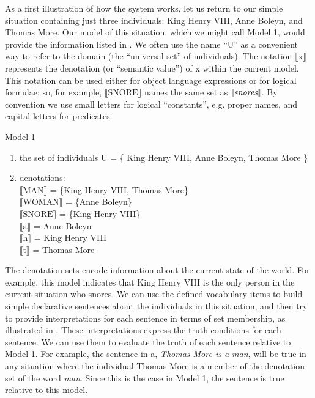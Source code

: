 As a first illustration of how the system works, let us return to our simple situation containing just three individuals: King Henry VIII, Anne Boleyn, and Thomas More. Our model of this situation, which we might call Model 1, would provide the information listed in . We often use the name “U” as a convenient way to refer to the domain (the “universal set” of individuals). The notation $\llbracket\text{x}\rrbracket$  represents the denotation (or “semantic value”) of x within the current model. This notation can be used either for object language expressions or for logical formulae; so, for example, $\llbracket\text{SNORE}\rrbracket$  names the same set as $\llbracket\text{\itshape snores}\rrbracket$. By convention we use small letters for logical “constants”, e.g. proper names, and capital letters for predicates.

\newpage 
\ea \label{ex:13.20}Model 1\\
\begin{enumerate}[label=\roman*.]
\item the set of individuals U = \{ King Henry VIII, Anne Boleyn, Thomas More \}
\item denotations:\\
$\llbracket\text{MAN}\rrbracket$  = \{King Henry VIII, Thomas More\}\\
$\llbracket\text{WOMAN}\rrbracket$  = \{Anne Boleyn\}\\
$\llbracket\text{SNORE}\rrbracket$  = \{King Henry VIII\}\\
$\llbracket\text{a}\rrbracket$  = Anne Boleyn\\
$\llbracket\text{h}\rrbracket$  = King Henry VIII\\
$\llbracket\text{t}\rrbracket$  = Thomas More
\end{enumerate}
\z

The denotation sets encode information about the current state of the world. For example, this model indicates that King Henry VIII is the only person in the current situation who snores. We can use the defined vocabulary items to build simple declarative sentences about the individuals in this situation, and then try to provide interpretations for each sentence in terms of set membership, as illustrated in . These interpretations express the truth conditions for each sentence. We can use them to evaluate the truth of each sentence relative to Model 1. For example, the sentence in a, \textit{Thomas More is a man}, will be true in any situation where the individual Thomas More is a member of the denotation set of the word \textit{man}. Since this is the case in Model 1, the sentence is true relative to this model.



